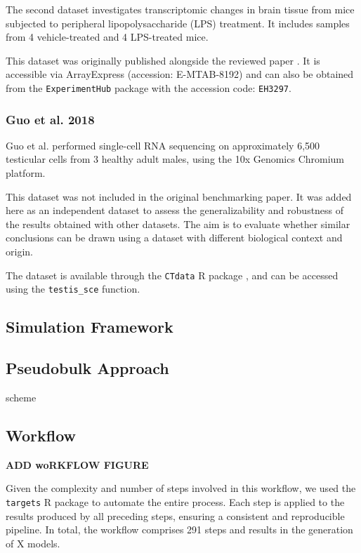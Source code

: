 \documentclass[a4paper, 11pt, twocolumn]{article}
\begin{document}
The second dataset investigates transcriptomic changes in brain tissue from mice subjected to peripheral lipopolysaccharide (LPS) treatment. It includes samples from 4 vehicle-treated and 4 LPS-treated mice.

This dataset was originally published alongside the reviewed paper \citep{muscat}. It is accessible via ArrayExpress (accession: E-MTAB-8192) and can also be obtained from the \texttt{ExperimentHub} package \citep{ExperimentHub} with the accession code: \texttt{EH3297}.

\subsubsection{Guo et al. 2018}

Guo et al. \citep{guo_adult_2018} performed single-cell RNA sequencing on approximately 6,500 testicular cells from 3 healthy adult males, using the 10x Genomics Chromium platform.

This dataset was not included in the original benchmarking paper. It was added here as an independent dataset to assess the generalizability and robustness of the results obtained with other datasets. The aim is to evaluate whether similar conclusions can be drawn using a dataset with different biological context and origin.

The dataset is available through the \texttt{CTdata} R package \citep{CTdata}, and can be accessed using the \texttt{testis\_sce} function.


\subsection{Simulation Framework}

\subsection{Pseudobulk Approach}
scheme

\subsection{Workflow}

\textbf{ADD woRKFLOW FIGURE}

Given the complexity and number of steps involved in this workflow, we used the \texttt{targets} R package \citep{targets} to automate the entire process. Each step is applied to the results produced by all preceding steps, ensuring a consistent and reproducible pipeline. In total, the workflow comprises 291 steps and results in the generation of X models.
\end{document}
